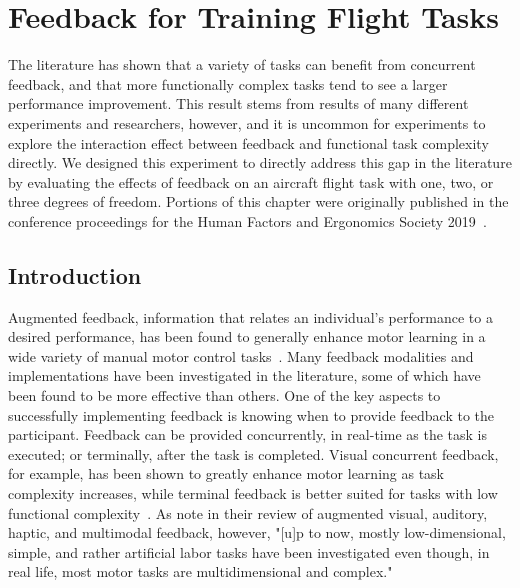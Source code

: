 \chapter{Feedback for Training Flight Tasks}
\label{chapter:aircraftfeedback}

The literature has shown that a variety of tasks can benefit from concurrent feedback, and that more functionally complex tasks tend to see a larger performance improvement.
This result stems from results of many different experiments and researchers, however, and it is uncommon for experiments to explore the interaction effect between feedback and functional task complexity directly.
We designed this experiment to directly address this gap in the literature by evaluating the effects of feedback on an aircraft flight task with one, two, or three degrees of freedom.
Portions of this chapter were originally published in the conference proceedings for the Human Factors and Ergonomics Society 2019~\citep{RN42}.

\section{Introduction}
Augmented feedback, information that relates an individual's performance to a desired performance, has been found to generally enhance motor learning in a wide variety of manual motor control tasks~\citep{salmoni_knowledge_1984}.
Many feedback modalities and implementations have been investigated in the literature, some of which have been found to be more effective than others.
One of the key aspects to successfully implementing feedback is knowing when to provide feedback to the participant.
Feedback can be provided concurrently, in real-time as the task is executed; or terminally, after the task is completed.
Visual concurrent feedback, for example, has been shown to greatly enhance motor learning as task complexity increases, while terminal feedback is better suited for tasks with low functional complexity~\citep{sigrist_augmented_2013}.
As \citeauthor{sigrist_augmented_2013} note in their review of augmented visual, auditory, haptic, and multimodal feedback, however, "[u]p to now, mostly low-dimensional, simple, and rather artificial labor tasks have been investigated even though, in real life, most motor tasks are multidimensional and complex."

